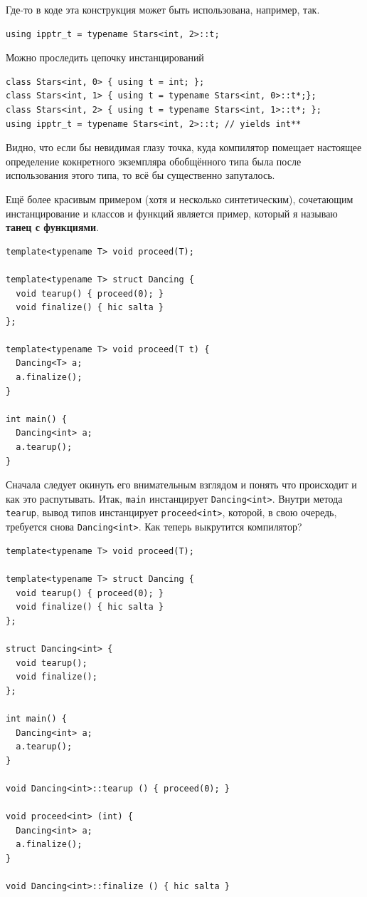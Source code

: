 \documentclass[a4paper,12pt,oneside]{article}
\begin{document}
Где-то в коде эта конструкция может быть использована, например, так.

\begin{lstlisting}
using ipptr_t = typename Stars<int, 2>::t;
\end{lstlisting}

Можно проследить цепочку инстанцирований

\begin{lstlisting}
class Stars<int, 0> { using t = int; };
class Stars<int, 1> { using t = typename Stars<int, 0>::t*;}; 
class Stars<int, 2> { using t = typename Stars<int, 1>::t*; };
using ipptr_t = typename Stars<int, 2>::t; // yields int**
\end{lstlisting}

Видно, что если бы невидимая глазу точка, куда компилятор помещает настоящее определение кокнретного экземпляра обобщённого типа была после использования этого типа, то всё бы существенно запуталось.

Ещё более красивым примером (хотя и несколько синтетическим), сочетающим инстанцирование и классов и функций является пример, который я называю \textbf{танец с функциями}.

\begin{lstlisting}
template<typename T> void proceed(T);

template<typename T> struct Dancing {
  void tearup() { proceed(0); }
  void finalize() { hic salta }
};

template<typename T> void proceed(T t) {
  Dancing<T> a;
  a.finalize();
}

int main() {
  Dancing<int> a;
  a.tearup();
}
\end{lstlisting}

Сначала следует окинуть его внимательным взглядом и понять что происходит и как это распутывать. Итак, \lstinline!main! инстанцирует \lstinline!Dancing<int>!. Внутри метода \lstinline!tearup!, вывод типов инстанцирует \lstinline!proceed<int>!, которой, в свою очередь, требуется снова \lstinline!Dancing<int>!. Как теперь выкрутится компилятор?

\begin{lstlisting}
template<typename T> void proceed(T);

template<typename T> struct Dancing {
  void tearup() { proceed(0); }
  void finalize() { hic salta }
};

struct Dancing<int> {
  void tearup();
  void finalize();
};

int main() {
  Dancing<int> a;
  a.tearup();
}

void Dancing<int>::tearup () { proceed(0); }

void proceed<int> (int) { 
  Dancing<int> a; 
  a.finalize(); 
}

void Dancing<int>::finalize () { hic salta }
\end{lstlisting}
\end{document}
